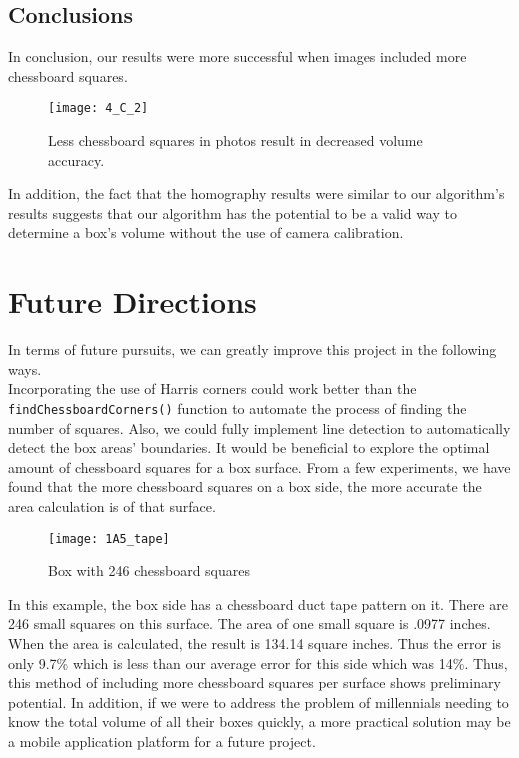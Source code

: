 \documentclass[11pt, twoside, reqno]{book}
\begin{document}
\section{Conclusions} 


In conclusion, our results were more successful when images included more chessboard squares. 

\begin{figure}[H]
	 \graphicspath{ {images/} }

	 
	\texttt{[image: 4\_C\_2]} 
		 \caption{Less chessboard squares in photos result in decreased volume accuracy.}
\end{figure}


In addition, the fact that the homography results were similar to our algorithm's results suggests that our algorithm has the potential to be a valid way to determine a box's volume without the use of camera calibration. 

\chapter{Future Directions}

In terms of future pursuits, we can greatly improve this project in the following ways.\\

Incorporating the use of Harris corners could work better than the \texttt{findChessboardCorners()} function to automate the process of finding the number of squares.
Also, we could fully implement line detection to automatically detect the box areas' boundaries. It would be beneficial to explore the optimal amount of chessboard squares for a box surface. From a few experiments, we have found that the more chessboard squares on a box side, the more accurate the area calculation is of that surface. \\

\begin{figure}
	 \graphicspath{ {images/} }
	\texttt{[image: 1A5\_tape]}
	\caption{Box with 246 chessboard squares}
\end{figure}
 


 In this example, the box side has a chessboard duct tape pattern on it. There are 246 small squares on this surface. The area of one small square is .0977 inches. When the area is calculated, the result is 134.14 square inches. Thus the error is only 9.7\% which is less than our average error for this side which was 14\%. Thus, this method of including more chessboard squares per surface shows preliminary potential. In addition, if we were to address the problem of millennials needing to know the total volume of all their boxes quickly, a more practical solution may be a mobile application platform for a future project. 
\end{document}
